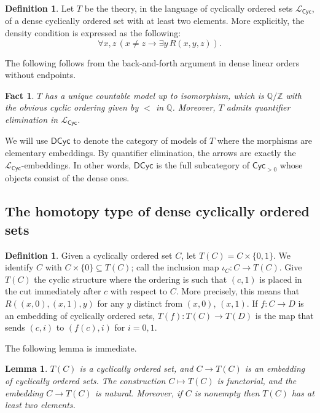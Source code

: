 \documentclass{amsart}
\theoremstyle{plain}
\newtheorem{lem}[thm]{Lemma}
\newtheorem{fact}[thm]{Fact}
\theoremstyle{definition}
\newtheorem{Def}[thm]{Definition}
\newcommand{\ints}{\mathbb{Z}}
\newcommand{\rats}{\mathbb{Q}}
\newcommand{\calL}{\mathcal{L}}
\newcommand{\Cyc}{\mathsf{Cyc}}
\newcommand{\DCyc}{\mathsf{DCyc}}
\begin{document}
\begin{Def}\label{def:dense}
Let $T$ be the theory, in the language of cyclically ordered sets $\calL_\Cyc$, of a dense cyclically ordered set with at least two elements. More explicitly, the density condition is expressed as the following:
\[
\forall x,z \, (x\neq z\rightarrow \exists y \,R(x,y,z)).
\]
\end{Def}
The following follows from the back-and-forth argument in dense linear orders without endpoints.
\begin{fact}\label{fact:qe}
    $T$ has a unique countable model up to isomorphism, which is $\rats/\ints$ with the obvious cyclic ordering given by $<$ in $\rats$. Moreover, $T$ admits quantifier elimination in $\mathcal{L}_\Cyc$. 
\end{fact}
We will use $\DCyc$ to denote the category of models of $T$ where the morphisms are elementary embeddings. By quantifier elimination, the arrows are exactly the $\calL_\Cyc$-embeddings. In other words, $\DCyc$ is the full subcategory of $\Cyc_{>0}$ whose objects consist of the dense ones.


\subsection{The homotopy type of dense cyclically ordered sets}

\begin{Def}
Given a cyclically ordered set $C$, let $T(C) = C \times \{0,1\}$. We identify $C$ with $C \times \{0\} \subseteq T(C)$; call the inclusion map $\iota_C: C \to T(C)$. Give $T(C)$ the cyclic structure where the ordering is such that $(c,1)$ is placed in the cut immediately after $c$ with respect to $C$. More precisely, this means that $R((x,0),(x,1),y)$ for any $y$ distinct from $(x,0)$, $(x,1)$. If $f:C\to D$ is an embedding of cyclically ordered sets, $T(f):T(C)\to T(D)$ is the map that sends $(c,i)$ to $(f(c),i)$ for $i=0,1$.
\end{Def}
The following lemma is immediate.
\begin{lem}\label{lem:T}
$T(C)$ is a cyclically ordered set, and $C \to T(C)$ is an embedding of cyclically ordered sets. The construction $C \mapsto T(C)$ is functorial, and the embedding $C \to T(C)$ is natural. Moreover, if $C$ is nonempty then $T(C)$ has at least two elements.
\end{lem}
\end{document}
